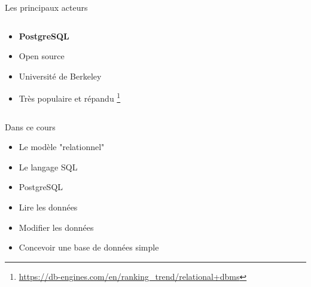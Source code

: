 \documentclass[xetex,dvipsnames]{beamer}
\begin{document}
\begin{frame}{Les principaux acteurs}
\begin{columns}
\begin{column}{0.5\textwidth}
\begin{center}
	    \end{center}
		\begin{itemize}
			\item \textbf{PostgreSQL}
			\item Open source
			\item Université de Berkeley
			\item Très populaire et répandu \footnote{{\tiny \url{https://db-engines.com/en/ranking_trend/relational+dbms}}}
		\end{itemize} 
	    \end{column}

    \end{columns}
\end{frame}




\begin{frame}{Dans ce cours}
\begin{itemize}
	\item Le modèle "relationnel"
	\item Le langage SQL
	\item PostgreSQL
	\item Lire les données
	\item Modifier les données
	\item Concevoir une base de données simple
\end{itemize}			
\end{frame}
\end{document}
